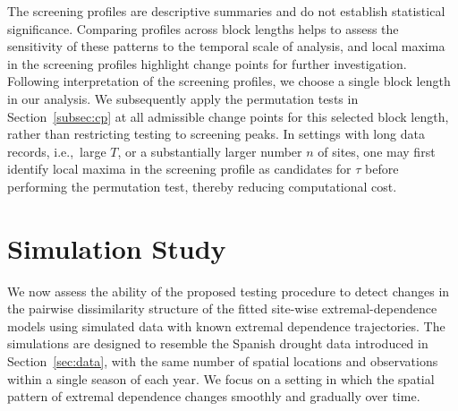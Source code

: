 \documentclass[APA,STIX1COL]{WileyNJD-v2}
\begin{document}
The screening profiles are descriptive summaries and do not establish statistical significance. Comparing profiles across block lengths helps to assess the sensitivity of these patterns to the temporal scale of analysis, and local maxima in the screening profiles highlight change points for further investigation. Following interpretation of the screening profiles, we choose a single block length in our analysis. We subsequently apply the permutation tests in Section~\ref{subsec:cp} at all admissible change points for this selected block length, rather than restricting testing to screening peaks. In settings with long data records, i.e.,~large $T$, or a substantially larger number $n$ of sites, one may first identify local maxima in the screening profile as candidates for $\tau$ before performing the permutation test, thereby reducing computational cost. 

\section{Simulation Study}
\label{sec:sim}

We now assess the ability of the proposed testing procedure to detect changes in the pairwise dissimilarity structure of the fitted site-wise extremal-dependence models using simulated data with known extremal dependence trajectories. 
  The simulations are designed to resemble the Spanish drought data introduced in Section~\ref{sec:data}, with the same number of spatial locations and observations within a single season of each year. 
  We focus on a setting in which the spatial pattern of extremal dependence changes smoothly and gradually over time.
\end{document}
